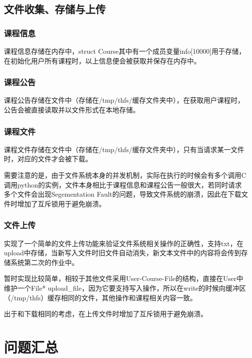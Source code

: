 \subsection{文件收集、存储与上传}

\subsubsection{课程信息}

课程信息存储在内存中，struct Course其中有一个成员变量info[10000]用于存储，在初始化用户所有课程时，以上信息便会被获取并保存在内存中。

\subsubsection{课程公告}

课程公告存储在文件中（存储在/tmp/thfs/缓存文件夹中），在获取用户课程时，公告会被直接读取并以文件形式在本地存储。

\subsubsection{课程文件}

课程文件存储在文件中（存储在/tmp/thfs/缓存文件夹中），只有当请求某一文件时，对应的文件才会被下载。

需要注意的是，由于文件系统本身的并发机制，实际在执行的时候会有多个调用C调用python的实例，文件本身相比于课程信息和课程公告一般很大，若同时请求多个文件会出现Segementation Fault的问题，导致文件系统的崩溃，因此在下载文件时增加了互斥锁用于避免崩溃。

\subsubsection{文件上传}

实现了一个简单的文件上传功能来验证文件系统相关操作的正确性，支持txt，在upload中存储，当新写入文件时旧文件自动消失，新文本文件中的内容将会传到存储系统第二次的作业中。

暂时实现比较简单，相较于其他文件采用User-Course-File的结构，直接在User中维护一个File* upload\_file，因为它要支持写入操作，所以在write的时候向缓冲区（/tmp/thfs）缓存相同的文件，其他操作和课程相关内容一致。

出于和下载相同的考虑，在上传文件时增加了互斥锁用于避免崩溃。

\section{问题汇总}

